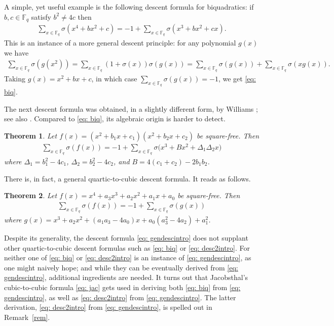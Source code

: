 \documentclass[11pt]{amsart}
\newcommand{\F}{\mathbb{F}}
\newcommand{\Fq}{\F_{\!q}}
\newtheorem{thm}{Theorem}[section]
\theoremstyle{definition}
\begin{document}
A simple, yet useful example is the following descent formula for biquadratics: if $b,c\in \Fq$ satisfy $b^2\neq 4c$ then
\begin{align}\label{eq: biq}
\sum_{x\in \Fq}\sigma(x^4+bx^2+c)=-1+\sum_{x\in \Fq}\sigma(x^3+bx^2+cx).
\end{align}
This is an instance of a more general descent principle: for any polynomial $g(x)$ we have
\begin{align*}
\sum_{x\in \Fq}\sigma(g(x^2))=\sum_{x\in \Fq}(1+\sigma(x))\sigma(g(x))=\sum_{x\in \Fq}\sigma(g(x))+\sum_{x\in \Fq}\sigma(xg(x)).
\end{align*}
Taking $g(x)=x^2+bx+c$, in which case $\sum_{x\in \Fq}\sigma(g(x))=-1$, we get \eqref{eq: biq}. 

The next descent formula was obtained, in a slightly different form, by Williams \cite{W79}; see also \cite[Thm.5.10]{N}. Compared to \eqref{eq: biq}, its algebraic origin is harder to detect.

\begin{thm}\label{thm: desc2}
Let $f(x)=(x^2+b_1x+c_1)(x^2+b_2x+c_2)$ be square-free. Then
\begin{align}\label{eq: desc2intro}
\sum_{x\in \Fq} \sigma(f(x))=-1+\sum_{x\in \Fq} \sigma\big(x^3+Bx^2+\Delta_1\Delta_2x\big)
\end{align}
where $\Delta_1=b_1^2-4c_1$, $\Delta_2=b_2^2-4c_2$, and $B=4(c_1+c_2)-2b_1b_2$.
\end{thm}

There is, in fact, a general quartic-to-cubic descent formula. It reads as follows.

\begin{thm}\label{thm: desc}
Let $f(x)=x^4+a_3x^3+a_2x^2+a_1x+a_0$ be square-free. Then
\begin{align}\label{eq: gendescintro}
\sum_{x\in \Fq} \sigma(f(x))=-1+\sum_{x\in \Fq} \sigma(g(x))
\end{align}
where $g(x)=x^3+a_2x^2+(a_1a_3-4a_0)x+a_0(a_3^2-4a_2)+a_1^2$.
\end{thm}

Despite its generality, the descent formula \eqref{eq: gendescintro} does not supplant other quartic-to-cubic descent formulas such as \eqref{eq: biq} or \eqref{eq: desc2intro}. For neither one of \eqref{eq: biq} or \eqref{eq: desc2intro} is an instance of \eqref{eq: gendescintro}, as one might naively hope; and while they can be eventually derived from \eqref{eq: gendescintro}, additional ingredients are needed. It turns out that Jacobsthal's cubic-to-cubic formula \eqref{eq: jac} gets used in deriving both \eqref{eq: biq} from \eqref{eq: gendescintro}, as well as \eqref{eq: desc2intro} from \eqref{eq: gendescintro}. The latter derivation, \eqref{eq: desc2intro} from \eqref{eq: gendescintro}, is spelled out in Remark~\ref{rem}.
\end{document}
